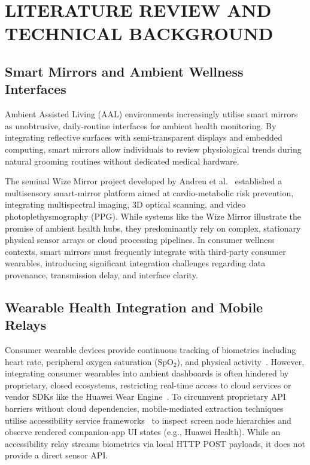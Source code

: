 \chapter{LITERATURE REVIEW AND TECHNICAL BACKGROUND}

\section{Smart Mirrors and Ambient Wellness Interfaces}
Ambient Assisted Living (AAL) environments increasingly utilise smart mirrors as unobtrusive, daily-routine interfaces for ambient health monitoring. By integrating reflective surfaces with semi-transparent displays and embedded computing, smart mirrors allow individuals to review physiological trends during natural grooming routines without dedicated medical hardware. 

The seminal Wize Mirror project developed by Andreu et al.~\cite{andreu2016wize} established a multisensory smart-mirror platform aimed at cardio-metabolic risk prevention, integrating multispectral imaging, 3D optical scanning, and video photoplethysmography (PPG). While systems like the Wize Mirror illustrate the promise of ambient health hubs, they predominantly rely on complex, stationary physical sensor arrays or cloud processing pipelines. In consumer wellness contexts, smart mirrors must frequently integrate with third-party consumer wearables, introducing significant integration challenges regarding data provenance, transmission delay, and interface clarity.

\section{Wearable Health Integration and Mobile Relays}
Consumer wearable devices provide continuous tracking of biometrics including heart rate, peripheral oxygen saturation ($\mathrm{SpO_2}$), and physical activity~\cite{patel2012review,lara2013survey}. However, integrating consumer wearables into ambient dashboards is often hindered by proprietary, closed ecosystems, restricting real-time access to cloud services or vendor SDKs like the Huawei Wear Engine~\cite{huaweiWear}. To circumvent proprietary API barriers without cloud dependencies, mobile-mediated extraction techniques utilise accessibility service frameworks~\cite{androidAccessibility} to inspect screen node hierarchies and observe rendered companion-app UI states (e.g., Huawei Health). While an accessibility relay streams biometrics via local HTTP POST payloads, it does not provide a direct sensor API. 

